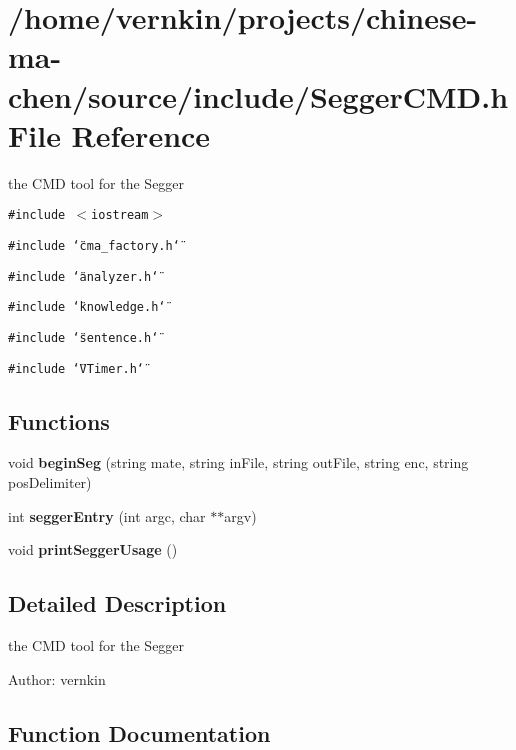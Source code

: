 \section{/home/vernkin/projects/chinese-ma-chen/source/include/SeggerCMD.h File Reference}
\label{SeggerCMD_8h}
the CMD tool for the Segger  


{\tt \#include $<$iostream$>$}\par
{\tt \#include \char`\"{}cma\_\-factory.h\char`\"{}}\par
{\tt \#include \char`\"{}analyzer.h\char`\"{}}\par
{\tt \#include \char`\"{}knowledge.h\char`\"{}}\par
{\tt \#include \char`\"{}sentence.h\char`\"{}}\par
{\tt \#include \char`\"{}VTimer.h\char`\"{}}\par
\subsection*{Functions}
\begin{CompactItemize}
\item 
void {\bf beginSeg} (string mate, string inFile, string outFile, string enc, string posDelimiter)
\item 
int \textbf{seggerEntry} (int argc, char $\ast$$\ast$argv)\label{SeggerCMD_8h_e624a37c8cde5a86c57acff2b8e2b15a}

\item 
void \textbf{printSeggerUsage} ()\label{SeggerCMD_8h_7c87e8750f51eca3e1b15b7f252d5131}

\end{CompactItemize}


\subsection{Detailed Description}
the CMD tool for the Segger 

\begin{Desc}
\item[Author:]vernkin \end{Desc}


\subsection{Function Documentation}
